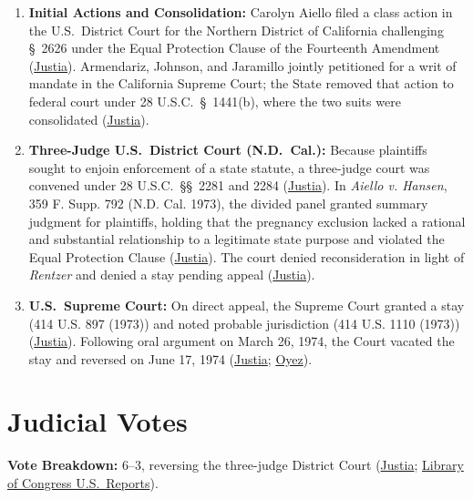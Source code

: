 \documentclass[12pt]{article}
\begin{document}
\begin{enumerate}
  \item \textbf{Initial Actions and Consolidation:} Carolyn Aiello filed a class action in the U.S.\ District Court for the Northern District of California challenging \S~2626 under the Equal Protection Clause of the Fourteenth Amendment (\href{https://supreme.justia.com/cases/federal/us/417/484/}{Justia}). Armendariz, Johnson, and Jaramillo jointly petitioned for a writ of mandate in the California Supreme Court; the State removed that action to federal court under 28 U.S.C.\ \S~1441(b), where the two suits were consolidated (\href{https://supreme.justia.com/cases/federal/us/417/484/}{Justia}).
  \item \textbf{Three-Judge U.S.\ District Court (N.D.\ Cal.):} Because plaintiffs sought to enjoin enforcement of a state statute, a three-judge court was convened under 28 U.S.C.\ \S\S~2281 and 2284 (\href{https://supreme.justia.com/cases/federal/us/417/484/}{Justia}). In \textit{Aiello v. Hansen}, 359 F. Supp. 792 (N.D. Cal. 1973), the divided panel granted summary judgment for plaintiffs, holding that the pregnancy exclusion lacked a rational and substantial relationship to a legitimate state purpose and violated the Equal Protection Clause (\href{https://supreme.justia.com/cases/federal/us/417/484/}{Justia}). The court denied reconsideration in light of \textit{Rentzer} and denied a stay pending appeal (\href{https://supreme.justia.com/cases/federal/us/417/484/}{Justia}).
  \item \textbf{U.S.\ Supreme Court:} On direct appeal, the Supreme Court granted a stay (414 U.S. 897 (1973)) and noted probable jurisdiction (414 U.S. 1110 (1973)) (\href{https://supreme.justia.com/cases/federal/us/417/484/}{Justia}). Following oral argument on March 26, 1974, the Court vacated the stay and reversed on June 17, 1974 (\href{https://supreme.justia.com/cases/federal/us/417/484/}{Justia}; \href{https://www.oyez.org/cases/1973/73-640}{Oyez}).
\end{enumerate}

\section{Judicial Votes}

\textbf{Vote Breakdown:} 6--3, reversing the three-judge District Court (\href{https://supreme.justia.com/cases/federal/us/417/484/}{Justia}; \href{https://tile.loc.gov/storage-services/service/ll/usrep/usrep417/usrep417484/usrep417484.pdf}{Library of Congress U.S.\ Reports}).
\end{document}

